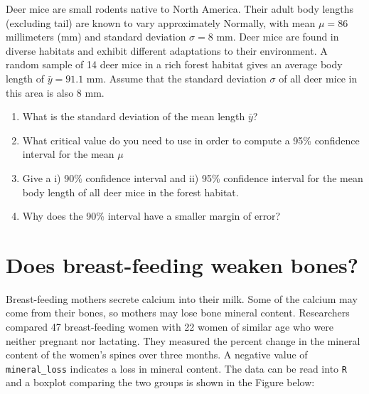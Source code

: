 \documentclass[letterpaper,9pt,twoside,printwatermark=false]{pinp}
\providecommand{\tightlist}{%
  \setlength{\itemsep}{0pt}\setlength{\parskip}{0pt}}
\begin{document}
Deer mice are small rodents native to North America. Their adult body
lengths (excluding tail) are known to vary approximately Normally, with
mean \(\mu = 86\) millimeters (mm) and standard deviation \(\sigma=8\)
mm. Deer mice are found in diverse habitats and exhibit different
adaptations to their environment. A random sample of 14 deer mice in a
rich forest habitat gives an average body length of \(\bar{y} = 91.1\)
mm. Assume that the standard deviation \(\sigma\) of all deer mice in
this area is also 8 mm.

\begin{enumerate}
\def\labelenumi{\alph{enumi}.}
\tightlist
\item
  What is the standard deviation of the mean length \(\bar{y}\)?
\item
  What critical value do you need to use in order to compute a 95\%
  confidence interval for the mean \(\mu\)
\item
  Give a i) 90\% confidence interval and ii) 95\% confidence interval
  for the mean body length of all deer mice in the forest habitat.
\item
  Why does the 90\% interval have a smaller margin of error?
\end{enumerate}

\section{Does breast-feeding weaken
bones?}\label{does-breast-feeding-weaken-bones}

Breast-feeding mothers secrete calcium into their milk. Some of the
calcium may come from their bones, so mothers may lose bone mineral
content. Researchers compared 47 breast-feeding women with 22 women of
similar age who were neither pregnant nor lactating. They measured the
percent change in the mineral content of the women's spines over three
months. A negative value of \texttt{mineral\_loss} indicates a loss in
mineral content. The data can be read into \texttt{R} and a boxplot
comparing the two groups is shown in the Figure below:

\begin{Shaded}
\begin{Highlighting}[]
\StringTok{ }\NormalTok{(}\NormalTok{)}
\end{Highlighting}
\end{Shaded}
\end{document}
